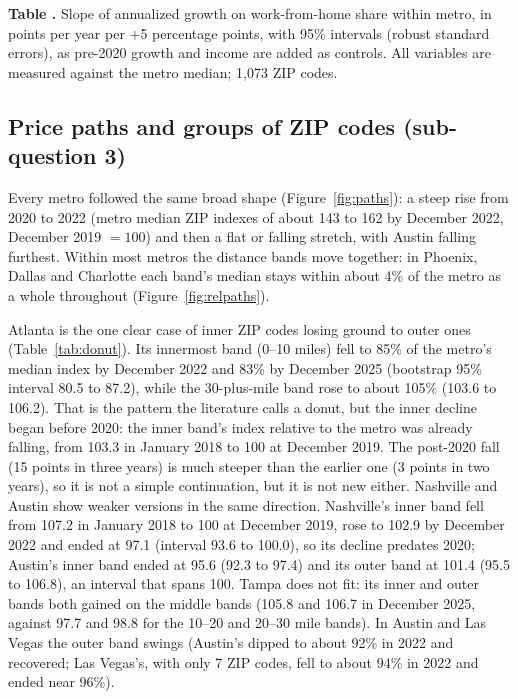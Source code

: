 \documentclass[11pt]{article}
\newcounter{tabnum}
\newcommand{\tab}[3]{%
  \begin{table}[!tbp]\centering
  \refstepcounter{tabnum}\label{#2}%
  {\small\raggedright\textbf{Table \thetabnum.} #3\par}\vspace{3pt}
  
  \end{table}}
\begin{document}
\tab{t_exposure_controls.tex}{tab:expoctl}{Slope of annualized growth on work-from-home share within metro, in points per year per $+$5 percentage points, with
95\% intervals (robust standard errors), as pre-2020 growth and income are added as controls. All variables are measured
against the metro median; 1,073 ZIP codes.}

\subsection{Price paths and groups of ZIP codes (sub-question 3)}
Every metro followed the same broad shape (Figure~\ref{fig:paths}): a steep rise from 2020 to 2022 (metro median ZIP indexes of
about 143 to 162 by December 2022, December 2019 $=100$) and then a flat or falling stretch, with Austin falling furthest. Within
most metros the distance bands move together: in Phoenix, Dallas and Charlotte each band's median stays within about 4\% of the
metro as a whole throughout (Figure~\ref{fig:relpaths}).

Atlanta is the one clear case of inner ZIP codes losing ground to outer ones (Table~\ref{tab:donut}). Its innermost band (0--10
miles) fell to 85\% of the metro's median index by December 2022 and 83\% by December 2025 (bootstrap 95\% interval 80.5 to 87.2),
while the 30-plus-mile band rose to about 105\% (103.6 to 106.2). That is the pattern the literature calls a donut, but the inner
decline began before 2020: the inner band's index relative to the metro was already falling, from 103.3 in January 2018 to 100 at
December 2019. The post-2020 fall (15 points in three years) is much steeper than the earlier one (3 points in two years), so it
is not a simple continuation, but it is not new either. Nashville and Austin show weaker versions in the same direction.
Nashville's inner band fell from 107.2 in January 2018 to 100 at December 2019, rose to 102.9 by December 2022 and ended at 97.1
(interval 93.6 to 100.0), so its decline predates 2020; Austin's inner band ended at 95.6 (92.3 to 97.4) and its outer band at
101.4 (95.5 to 106.8), an interval that spans 100. Tampa does not fit: its inner and outer bands both gained on the middle bands
(105.8 and 106.7 in December 2025, against 97.7 and 98.8 for the 10--20 and 20--30 mile bands). In Austin and Las Vegas the outer
band swings (Austin's dipped to about 92\% in 2022 and recovered; Las Vegas's, with only 7 ZIP codes, fell to about 94\% in 2022
and ended near 96\%).
\end{document}
